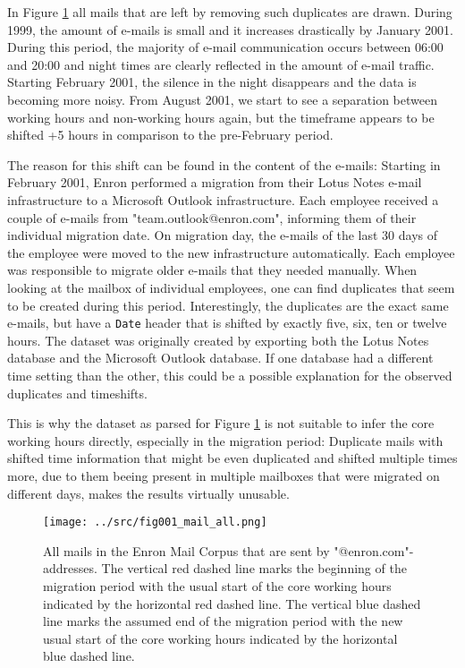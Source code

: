 \documentclass{article}
\begin{document}
In Figure \ref{fig:allmail} all mails that are left by removing such duplicates
are drawn. During 1999, the amount of e-mails is small and it increases
drastically by January 2001. During this period, the majority of e-mail
communication occurs between 06:00 and 20:00 and night times are clearly
reflected in the amount of e-mail traffic. Starting February 2001, the silence
in the night disappears and the data is becoming more noisy. From August 2001,
we start to see a separation between working hours and non-working hours again,
but the timeframe appears to be shifted +5 hours in comparison to the
pre-February period.

The reason for this shift can be found in the content of the e-mails: Starting
in February 2001, Enron performed a migration from their Lotus Notes e-mail
infrastructure to a Microsoft Outlook infrastructure. Each employee received a
couple of e-mails from "team.outlook@enron.com", informing them of their
individual migration date. On migration day, the e-mails of the last 30 days of
the employee were moved to the new infrastructure automatically. Each employee
was responsible to migrate older e-mails that they needed manually. When looking
at the mailbox of individual employees, one can find duplicates that seem to be
created during this period. Interestingly, the duplicates are the exact same
e-mails, but have a \texttt{Date} header that is shifted by exactly five, six,
ten or twelve hours. The dataset was originally created by exporting both the
Lotus Notes database and the Microsoft Outlook database. If one database had a
different time setting than the other, this could be a possible explanation for
the observed duplicates and timeshifts.

This is why the dataset as parsed for Figure \ref{fig:allmail} is not suitable
to infer the core working hours directly, especially in the migration period:
Duplicate mails with shifted time information that might be even duplicated and
shifted multiple times more, due to them beeing present in multiple mailboxes
that were migrated on different days, makes the results virtually unusable.

\begin{figure}
  \centering
  \texttt{[image: ../src/fig001\_mail\_all.png]}
   \caption{All mails in the Enron Mail Corpus that are sent by
  "@enron.com"-addresses. The vertical red dashed line marks the beginning of
  the migration period with the usual start of the core working hours indicated
  by the horizontal red dashed line. The vertical blue dashed line marks the
  assumed end of the migration period with the new usual start of the core
  working hours indicated by the horizontal blue dashed line.}
  \label{fig:allmail}
\end{figure}
\end{document}
